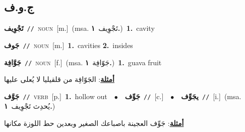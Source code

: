 \documentclass[10pt,a4paper,twoside]{article} %
\begin{document}
\begin{multicols}{2}
\vspace{-3mm}
\subsection*{\color{blue}\foreignlanguage{arabic}{ج.و.ف}\color{blue}{}} 

{\setlength\topsep{0pt}\textbf{\foreignlanguage{arabic}{تَجْوِيف}}\ {\color{gray}\texttt{//}\color{black}}\ \textsc{noun}\ [m.]\ \color{gray}(msa. \foreignlanguage{arabic}{تَجْوِيف}~\foreignlanguage{arabic}{\textbf{١.}})\color{black}\ \textbf{1.}~cavity\ } \vspace{2mm}

{\setlength\topsep{0pt}\textbf{\foreignlanguage{arabic}{جَوف}}\ {\color{gray}\texttt{//}\color{black}}\ \textsc{noun}\ [m.]\ \textbf{1.}~cavities  \textbf{2.}~insides\ } \vspace{2mm}

{\setlength\topsep{0pt}\textbf{\foreignlanguage{arabic}{جَوَّافِة}}\ {\color{gray}\texttt{//}\color{black}}\ \textsc{noun}\ [f.]\ \color{gray}(msa. \foreignlanguage{arabic}{جَوّافِة}~\foreignlanguage{arabic}{\textbf{١.}})\color{black}\ \textbf{1.}~guava fruit\  \begin{flushright}\color{gray}\foreignlanguage{arabic}{\textbf{\underline{\foreignlanguage{arabic}{أمثلة}}}: الجَوّافِة من قلقيليا لا يُعلى عليها}\end{flushright}\color{black}} \vspace{2mm}

{\setlength\topsep{0pt}\textbf{\foreignlanguage{arabic}{جَوَّف}}\ {\color{gray}\texttt{//}\color{black}}\ \textsc{verb}\ [p.]\ \textbf{1.}~hollow out\ \ $\bullet$\ \ \setlength\topsep{0pt}\textbf{\foreignlanguage{arabic}{جَوِّف}}\ {\color{gray}\texttt{//}\color{black}}\ [c.]\ \ $\bullet$\ \ \setlength\topsep{0pt}\textbf{\foreignlanguage{arabic}{يجَوِّف}}\ {\color{gray}\texttt{//}\color{black}}\ [i.]\ \color{gray}(msa. \foreignlanguage{arabic}{يُحدِث تَجْوِيف}~\foreignlanguage{arabic}{\textbf{١.}})\color{black}\  \begin{flushright}\color{gray}\foreignlanguage{arabic}{\textbf{\underline{\foreignlanguage{arabic}{أمثلة}}}: جَوِّف العجينة باصباعك الصغير وبعدين حط اللوزة مكانها}\end{flushright}\color{black}} \vspace{2mm}


\end{multicols}
\end{document}
